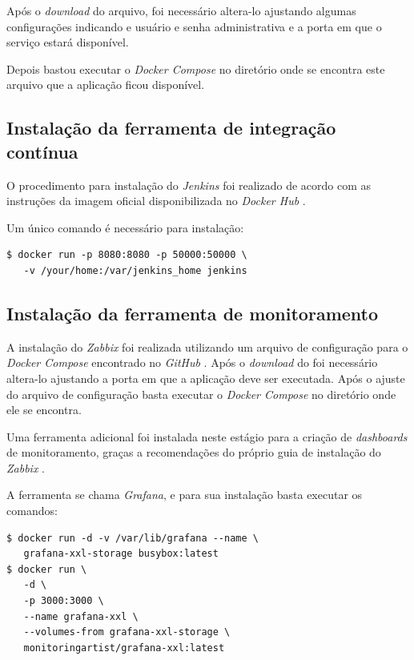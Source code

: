 \documentclass[
12pt,				%
openright,			%
oneside,			%
a4paper,			%
english,			%
french,				%
spanish,			%
brazil,				%
]{abntex2}
\begin{document}
Após o \textit{download} do arquivo, foi necessário altera-lo ajustando algumas configurações indicando e usuário e senha administrativa e a porta em que o serviço estará disponível.

Depois bastou executar o \textit{Docker Compose} no diretório onde se encontra este arquivo que a aplicação ficou disponível.

\subsection{Instalação da ferramenta de integração contínua}

O procedimento para instalação do \textit{Jenkins} foi realizado de acordo com as instruções da imagem oficial disponibilizada no \textit{Docker Hub} \cite{DockerHub:Jenkins}.

Um único comando é necessário para instalação:

\begin{lstlisting}
$ docker run -p 8080:8080 -p 50000:50000 \
   -v /your/home:/var/jenkins_home jenkins
\end{lstlisting}

\subsection{Instalação da ferramenta de monitoramento}

A instalação do \textit{Zabbix} foi realizada utilizando um arquivo de configuração para o \textit{Docker Compose} encontrado no \textit{GitHub} \cite{GitHub:ZabbixCompose}. Após o \textit{download} do foi necessário altera-lo ajustando a porta em que a aplicação deve ser executada. Após o ajuste do arquivo de configuração basta executar o \textit{Docker Compose} no diretório onde ele se encontra.

Uma ferramenta adicional foi instalada neste estágio para a criação de \textit{dashboards} de monitoramento, graças a recomendações do próprio guia de instalação do \textit{Zabbix} \cite{Zabbix:Dockerized}.

A ferramenta se chama \textit{Grafana}, e para sua instalação basta executar os comandos:

\begin{lstlisting}
$ docker run -d -v /var/lib/grafana --name \
   grafana-xxl-storage busybox:latest
$ docker run \
   -d \
   -p 3000:3000 \
   --name grafana-xxl \
   --volumes-from grafana-xxl-storage \
   monitoringartist/grafana-xxl:latest
\end{lstlisting}
\end{document}
